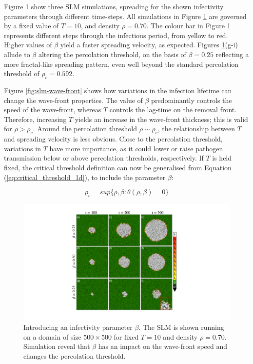 Figure \ref{fig:slm} show three SLM simulations, spreading for the shown infectivity parameters through different time-steps.
All simulations in Figure \ref{fig:slm} are governed by a fixed value of $T=10$, and density $\rho=0.70$.
The colour bar in Figure \ref{fig:slm} represents different steps through the infectious period, from yellow to red.
Higher values of $\beta$ yield a faster spreading velocity,
as expected.
Figures \ref{fig:slm}(g-i) allude to $\beta$ altering the percolation threshold, on the basis of $\beta=0.25$ reflecting a more fractal-like spreading pattern, even well beyond the standard percolation threshold of $\rho_c=0.592$.

Figure \ref{fig:slm-wave-front} shows how variations in the infection lifetime can change the wave-front properties. 
The value of $\beta$ predominantly controls the speed of the wave-front, whereas $T$ controls the lag-time on the removal front. 
Therefore, increasing $T$ yields an increase in the wave-front thickness;
this is valid for $\rho > \rho_c$.
Around the percolation threshold $\rho \sim \rho_c$, the relationship between $T$ and spreading velocity is less obvious. 
Close to the percolation threshold, variations in $T$ have more importance, as it could lower or raise pathogen transmission below or above percolation thresholds, respectively.
If $T$ is held fixed, the critical threshold definition can now be generalised from Equation (\ref{eq:critical_threshold_1d}), to include the parameter $\beta$: 

\begin{equation}
\label{eq:critical_threshold_1d}
    \rho _{c}=sup \lbrace \rho, \beta : \theta (\rho, \beta ) = 0 \rbrace
\end{equation}

\begin{figure}
    \centering
    \includegraphics[scale=0.45]{chapter3/figures/figure3-two-param-model.pdf}
    \caption{Introducing an infectivity parameter $\beta$. The SLM is shown running on a domain of size $500\times500$ for fixed $T=10$ and density $\rho=0.70$. Simulation reveal that $\beta$ has an impact on the wave-front speed and changes the percolation threshold.}
    \label{fig:slm}
\end{figure}


